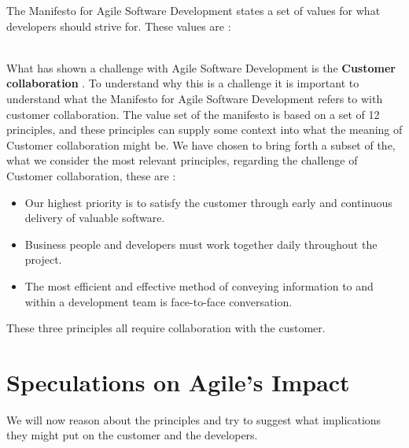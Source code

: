 The Manifesto for Agile Software Development states a set of values for what developers should strive for. These values are \cite{theAgileManifesto}: \\
\noindent\hrulefill\par
\noindent{} \\
What has shown a challenge with Agile Software Development is the \textbf{Customer collaboration} \cite{Hoda2011TheIO}.
To understand why this is a challenge it is important to understand what the Manifesto for Agile Software Development refers to with customer collaboration.
The value set of the manifesto is based on a set of 12 principles, and these principles can supply some context into what the meaning of Customer collaboration might be.
We have chosen to bring forth a subset of the, what we consider the most relevant principles, regarding the challenge of Customer collaboration, these are \cite{theAgileManifesto}:

\begin{itemize}
  \item Our highest priority is to satisfy the customer through early and continuous delivery of valuable software.
  \item Business people and developers must work together daily throughout the project.
  \item The most efficient and effective method of conveying information to and within a development team is face-to-face conversation.
\end{itemize}

These three principles all require collaboration with the customer.

\section{Speculations on Agile's Impact}
We will now reason about the principles and try to suggest what implications they might put on the customer and the developers.

